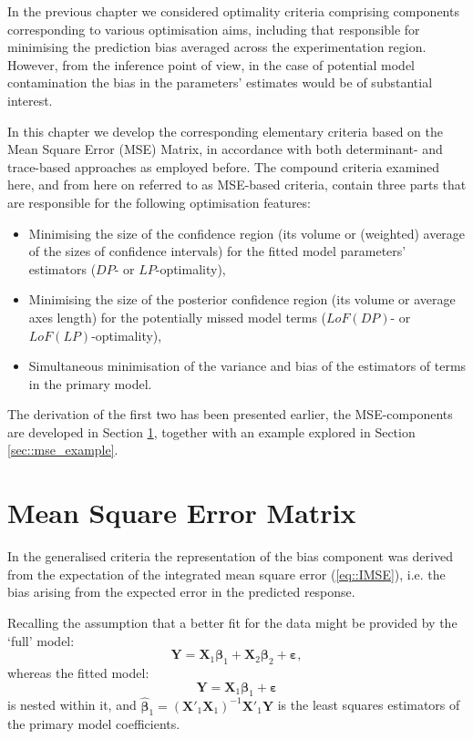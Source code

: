 
In the previous chapter we considered optimality criteria comprising components corresponding to various optimisation aims, including that responsible for minimising the prediction bias averaged across the experimentation region. However, from the inference point of view, in the case of potential model contamination the bias in the parameters' estimates would be of substantial interest.

In this chapter we develop the corresponding elementary criteria based on the Mean Square Error (MSE) Matrix, in accordance with both determinant- and trace-based approaches as employed before. The compound criteria examined here, and from here on referred to as MSE-based criteria, contain three parts that are responsible for the following optimisation features:
\begin{itemize}
\item Minimising the size of the confidence region (its volume or (weighted) average of the sizes of confidence intervals) for the fitted model parameters' estimators ($DP$- or $LP$-optimality),
\item Minimising the size of the posterior confidence region (its volume or average axes length) for the potentially missed model terms ($LoF(DP)$- or $LoF(LP)$-optimality),
\item Simultaneous minimisation of the variance and bias of the estimators of terms in the primary model. 
\end{itemize}

The derivation of the first two has been presented earlier, the MSE-components are developed in Section \ref{sec::mse_criteria}, together with an example explored in Section \ref{sec::mse_example}. 

\section{Mean Square Error Matrix}
\label{sec::mse_criteria}

In the generalised criteria the representation of the bias component was derived from the expectation of the integrated mean square error (\ref{eq::IMSE}), i.e. the bias arising from the expected error in the predicted response. 

Recalling the assumption that a better fit for the data might be provided by the `full' model: 
\begin{equation}
\label{eq::full_m}
\bm{Y}=\bm{X}_{1}\bm{\beta}_{1}+\bm{X}_{2}\bm{\beta}_{2}+\bm{\varepsilon},
\end{equation}
whereas the fitted model:
\begin{equation*}
\bm{Y}=\bm{X}_{1}\bm{\beta}_{1}+\bm{\varepsilon}
\end{equation*}
is nested within it, and $\bm{\hat{\beta}}_{1}=(\bm{X}'_{1}\bm{X}_{1})^{-1}\bm{X}'_{1}\bm{Y}$ is the least squares estimators of the primary model coefficients.

